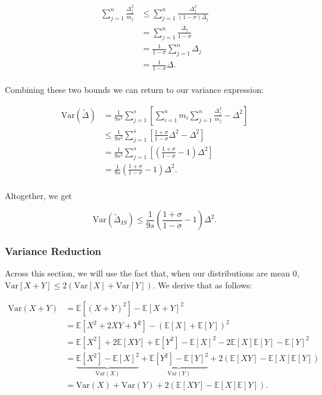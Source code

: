 \documentclass[11pt, margin=1in]{article}
\begin{document}
\[
\begin{aligned}
\sum_{j = 1}^{n}\frac{\Delta_j^2}{m_j} &\leq \sum_{j = 1}^{n}\frac{\Delta_j^2}{\left(1 - \sigma\right) \Delta_j} \\
&= \sum_{j = 1}^{n}\frac{\Delta_j}{1 - \sigma} \\
&= \frac{1}{1 - \sigma} \sum_{j = 1}^{n}\Delta_j \\
&= \frac{1}{1 - \sigma} \Delta. \\
\end{aligned}
\]

Combining these two bounds we can return to our variance expression:

\[
\begin{aligned}
\mathrm{Var}\left(\tilde{\Delta}\right) &= \frac{1}{9s^2} \sum_{j = 1}^{s} \left[\sum_{i = 1}^{n}m_i \sum_{j = 1}^{n}\frac{\Delta_j^2}{m_j} - \Delta^2\right] \\
&\leq \frac{1}{9s^2} \sum_{j = 1}^{s} \left[\frac{1 + \sigma}{1 - \sigma} \Delta^2 - \Delta^2\right] \\
&= \frac{1}{9s^2} \sum_{j = 1}^{s} \left[\left(\frac{1 + \sigma}{1 - \sigma} - 1\right) \Delta^2\right] \\
&= \frac{1}{9s} \left(\frac{1 + \sigma}{1 - \sigma} - 1\right) \Delta^2. \\
\end{aligned}
\]

Altogether, we get

\begin{equation}
    \mathrm{Var}\left(\tilde{\Delta}_{IS}\right) \leq \frac{1}{9s} \left(\frac{1 + \sigma}{1 - \sigma} - 1\right) \Delta^2.
\label{eq:Var_Delta_IS}
\end{equation}

\subsubsection{Variance Reduction}
\label{sec:variance-reduction-analysis}

Across this section, we will use the fact that, when our distributions are mean 0, $\mathrm{Var}\left[X+Y\right] \leq 2\left(\mathrm{Var}\left[X\right] + \mathrm{Var}\left[Y\right]\right)$. We derive that as follows:

\[
\begin{aligned}
\mathrm{Var}(X + Y) &= \mathbb{E}[(X + Y)^2] - \mathbb{E}[X + Y]^2 \\
&= \mathbb{E}[X^2 + 2XY + Y^2] - (\mathbb{E}[X] + \mathbb{E}[Y])^2 \\
&= \mathbb{E}[X^2] + 2\mathbb{E}[XY] + \mathbb{E}[Y^2] - \mathbb{E}[X]^2 - 2\mathbb{E}[X]\mathbb{E}[Y] - \mathbb{E}[Y]^2 \\
&= \underbrace{\mathbb{E}[X^2] - \mathbb{E}[X]^2}_{\mathrm{Var}(X)} + \underbrace{\mathbb{E}[Y^2] - \mathbb{E}[Y]^2}_{\mathrm{Var}(Y)} + 2(\mathbb{E}[XY] - \mathbb{E}[X]\mathbb{E}[Y]) \\
&= \mathrm{Var}(X) + \mathrm{Var}(Y) + 2(\mathbb{E}[XY] - \mathbb{E}[X]\mathbb{E}[Y]).
\end{aligned}
\]
    
\end{document}

